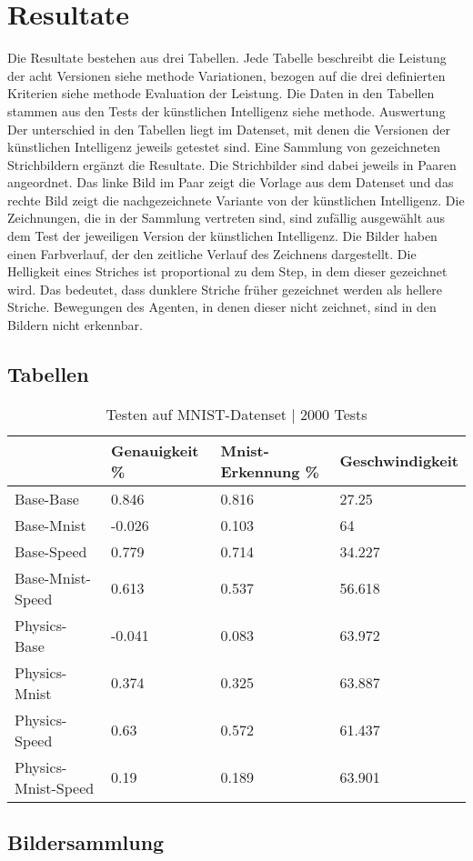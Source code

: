 \chapter{Resultate}
Die Resultate bestehen aus drei Tabellen. Jede Tabelle beschreibt die Leistung
der acht Versionen {siehe methode Variationen}, bezogen auf die drei definierten
Kriterien {siehe methode Evaluation der Leistung}. Die Daten in den Tabellen
stammen aus den Tests der künstlichen Intelligenz {siehe methode. Auswertung}
Der unterschied in den Tabellen liegt im Datenset, mit denen die Versionen der
künstlichen Intelligenz jeweils getestet sind. 
Eine Sammlung von gezeichneten Strichbildern ergänzt die Resultate. Die
Strichbilder sind dabei jeweils in Paaren angeordnet. Das linke Bild im Paar
zeigt die Vorlage aus dem Datenset und das rechte Bild zeigt die nachgezeichnete
Variante von der künstlichen Intelligenz. Die Zeichnungen, die in der Sammlung
vertreten sind, sind zufällig ausgewählt aus dem Test der jeweiligen Version der
künstlichen Intelligenz. Die Bilder haben einen Farbverlauf, der den zeitliche
Verlauf des Zeichnens dargestellt. Die Helligkeit eines Striches ist
proportional zu dem Step, in dem dieser gezeichnet wird. Das bedeutet, dass
dunklere Striche früher gezeichnet werden als hellere Striche. Bewegungen des
Agenten, in denen dieser nicht zeichnet, sind in den Bildern nicht erkennbar.

\newpage
\section{Tabellen}
\begin{table}[!ht]
    \centering
    \caption{Testen auf MNIST-Datenset | 2000 Tests}
    \begin{tabular}{|l|l|l|l|}
    \hline
        ~ & Genauigkeit \% & Mnist-Erkennung \% & Geschwindigkeit \\ \hline
        Base-Base & 0.846 & 0.816 & 27.25 \\ \hline
        Base-Mnist & -0.026 & 0.103 & 64 \\ \hline
        Base-Speed & 0.779 & 0.714 & 34.227 \\ \hline
        Base-Mnist-Speed & 0.613 & 0.537 & 56.618 \\ \hline
        Physics-Base & -0.041 & 0.083 & 63.972 \\ \hline
        Physics-Mnist & 0.374 & 0.325 & 63.887 \\ \hline
        Physics-Speed & 0.63 & 0.572 & 61.437 \\ \hline
        Physics-Mnist-Speed & 0.19 & 0.189 & 63.901 \\ \hline
    \end{tabular}
    \label{tab:MNIST}
\end{table}


\section{Bildersammlung}
